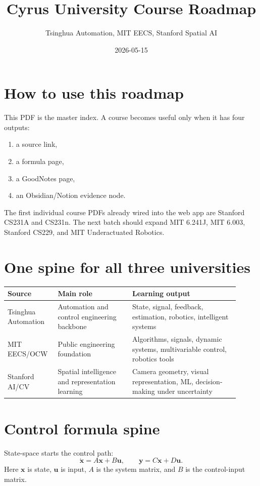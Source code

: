 \documentclass[11pt]{article}
\title{Cyrus University Course Roadmap}
\author{Tsinghua Automation, MIT EECS, Stanford Spatial AI}
\date{2026-05-15}
\begin{document}
\maketitle

\section*{How to use this roadmap}
This PDF is the master index. A course becomes useful only when it has four outputs:
\begin{enumerate}[leftmargin=1.4em]
  \item a source link,
  \item a formula page,
  \item a GoodNotes page,
  \item an Obsidian/Notion evidence node.
\end{enumerate}

The first individual course PDFs already wired into the web app are Stanford CS231A and CS231n. The next batch should expand MIT 6.241J, MIT 6.003, Stanford CS229, and MIT Underactuated Robotics.

\section*{One spine for all three universities}
\begin{tabular}{p{0.18\linewidth}p{0.3\linewidth}p{0.43\linewidth}}
\toprule
Source & Main role & Learning output \\
\midrule
Tsinghua Automation & Automation and control engineering backbone & State, signal, feedback, estimation, robotics, intelligent systems \\
MIT EECS/OCW & Public engineering foundation & Algorithms, signals, dynamic systems, multivariable control, robotics tools \\
Stanford AI/CV & Spatial intelligence and representation learning & Camera geometry, visual representation, ML, decision-making under uncertainty \\
\bottomrule
\end{tabular}

\section*{Control formula spine}
State-space starts the control path:
\[
  \dot{\bm{x}} = A\bm{x} + B\bm{u}, \qquad \bm{y}=C\bm{x}+D\bm{u}.
\]
Here $\bm{x}$ is state, $\bm{u}$ is input, $A$ is the system matrix, and $B$ is the control-input matrix.
\end{document}

